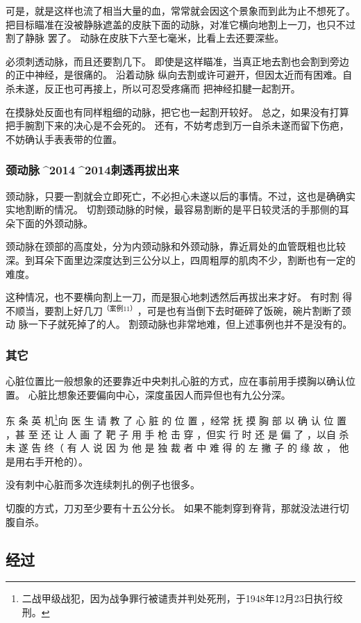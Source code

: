 \documentclass[UTF8]{ctexart}
\begin{document}
可是，就是这样也流了相当大量的血，常常就会因这个景象而到此为止不想死了。
把目标瞄准在没被静脉遮盖的皮肤下面的动脉，对准它横向地割上一刀，也只不过割了静脉 罢了。
动脉在皮肤下六至七毫米，比看上去还要深些。

必须刺透动脉，而且还要割几下。
即使是这样瞄准，当真正地去割也会割到旁边的正中神经，是很痛的。
沿着动脉 纵向去割或许可避开，但因太近而有困难。自杀未遂，反正也可再接上，所以可忍受疼痛而 把神经扣腱一起割开。

在摸脉处反面也有同样粗细的动脉，把它也一起割开较好。
总之，如果没有打算把手腕割下来的决心是不会死的。 
还有，不妨考虑到万一自杀未遂而留下伤疤，不妨确认手表表带的位置。

\subsubsection{颈动脉^^^^2014^^^^2014刺透再拔出来}

颈动脉，只要一割就会立即死亡，不必担心未遂以后的事情。不过，这也是确确实实地割断的情况。
切割颈动脉的时候，最容易割断的是平日较灵活的手那侧的耳朵下面的外颈动脉。

颈动脉在颈部的高度处，分为内颈动脉和外颈动脉，靠近肩处的血管既粗也比较深。到耳朵下面里边深度达到三公分以上，四周粗厚的肌肉不少，割断也有一定的难度。

这种情况，也不要横向割上一刀，而是狠心地刺透然后再拔出来才好。
有时割 得不顺当，要割上好几刀$^{（案例11）}$，可是也有当倒下去时砸碎了饭碗，碗片割断了颈动 脉一下子就死掉了的人。
割颈动脉也非常地难，但上述事例也并不是没有的。

\subsubsection{其它}

心脏位置比一般想象的还要靠近中央刺扎心脏的方式，应在事前用手摸胸以确认位置。
心脏比想象还要偏向中心，深度虽因人而异但也有九公分深。

东 条 英 机\footnote{二战甲级战犯，因为战争罪行被谴责并判处死刑，于1948年12月23日执行绞刑。}向 医 生 请 教 了 心 脏 的 位 置 ，经常 抚 摸 胸 部 以 确 认 位 置 ，甚 至 还 让 人 画 了 靶 子 用 手 枪 击 穿 ，但实 行 时 还 是 偏 了 ，以自 杀 未 遂 告 终（ 有 人 说 因 为 他 是 独 裁 者 中 难 得 的 左 撇 子 的 缘 故 ， 他是用右手开枪的）。

没有刺中心脏而多次连续刺扎的例子也很多。

切腹的方式，刀刃至少要有十五公分长。
如果不能刺穿到脊背，那就没法进行切腹自杀。

\subsection{经过}
\end{document}

